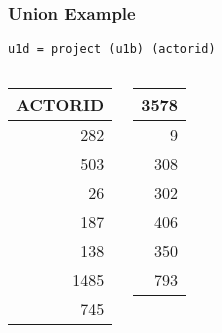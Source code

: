 \documentclass[dvipsnames]{beamer}
\theoremstyle{plain}
\begin{document}
\begin{frame}[fragile]
  \frametitle{Union Example}

  \begin{example}
    \begin{lstlisting}
u1d = project (u1b) (actorid)
    \end{lstlisting}

    \pause
    \begin{columns}[b]
      \begin{tiny}
      \begin{table}
        \begin{tabular}{|r|}\hline
ACTORID\\\hline\hline
    282\\\hline
    503\\\hline
     26\\\hline
    187\\\hline
    138\\\hline
   1485\\\hline
    745\\\hline
        \end{tabular}
      \end{table}
      \end{tiny}

      \begin{tiny}
      \begin{table}
        \begin{tabular}{|r|}\hline
   3578\\\hline
      9\\\hline
    308\\\hline
    302\\\hline
    406\\\hline
    350\\\hline
    793\\\hline
        \end{tabular}
      \end{table}
      \end{tiny}
    \end{columns}
  \end{example}
\end{frame}
\end{document}
